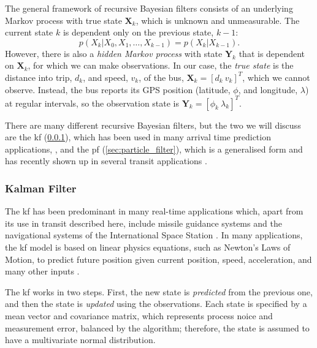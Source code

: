\documentclass[12pt,a4paper]{article}
\newcommand{\bY}{\mathbf{Y}}
\newcommand{\bX}{\mathbf{X}}
\begin{document}
The general framework of recursive Bayesian filters consists of an
underlying Markov process with true state $\bX_k$, which is unknown and unmeasurable.
The current state $k$ is dependent only on the previous state, $k-1$:
\begin{equation}
  \label{eq:markov_state}
  p(X_k | X_0, X_1, \ldots, X_{k-1}) = p(X_k | X_{k-1}).
\end{equation}
However, there is also a \emph{hidden Markov process}
with state $\bY_k$ that is dependent on $\bX_k$, 
for which we can make observations.
In our case, the \emph{true state} is the distance into trip, $d_k$, 
and speed, $v_k$, of the bus,
$\bX_k = [d_k\ v_k]^T$, which we cannot observe.
Instead, the bus reports its GPS position
(latitude, $\phi$, and longitude, $\lambda$) at regular intervals,
so the observation state is $\bY_k = [\phi_k\ \lambda_k]^T$.


There are many different recursive Bayesian filters,
but the two we will discuss are the \gls{kf} (\cref{sec:kalman_filter}),
which has been used in many arrival time prediction applications,
\citep{wall-dailey:1999,dailey:2001,cathey-dailey:2003},
and the \gls{pf} (\cref{sec:particle_filter}), 
which is a generalised form and has recently
shown up in several transit applications 
\citep{chen-rakha:2014,hans-etal:2015,cn}.



\subsubsection{Kalman Filter}
\label{sec:kalman_filter}

The \gls{kf} has been predominant in 
many real-time applications which, apart from its use in transit described here,
include missile guidance systems and the navigational systems of
the International Space Station \citep{cn}.
In many applications, the \gls{kf} model is based on linear physics equations,
such as Newton's Laws of Motion, to predict future position
given current position, speed, acceleration, and many other inputs \citep{cn}.


The \gls{kf} works in two steps.
First, the new state is \emph{predicted} from the previous one,
and then the state is \emph{updated} using the observations.
Each state is specified by a mean vector and covariance matrix,
which represents process noice and measurement error,
balanced by the algorithm;
therefore, the state is assumed to have a multivariate normal distribution.
\end{document}
